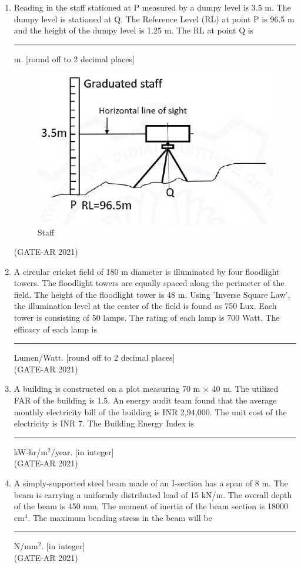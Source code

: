 \documentclass[a4paper,10pt]{article}
\begin{document}
\begin{enumerate}
    \item Reading in the staff stationed at P measured by a dumpy level is 3.5 m. The dumpy level is stationed at Q. The Reference Level (RL) at point P is 96.5 m and the height of the dumpy level is 1.25 m. The RL at point Q is \rule{2cm}{0.4pt} m. [round off to 2 decimal places] \\
    \begin{figure}[h!]
    \centering
    \includegraphics[width=0.5\columnwidth]{figs/11.jpg}
    \caption{Staff}
    \label{fig:Img11}
    \end{figure}
    \hfill (GATE-AR 2021)

    \item A circular cricket field of 180 m diameter is illuminated by four floodlight towers. The floodlight towers are equally spaced along the perimeter of the field. The height of the floodlight tower is 48 m. Using 'Inverse Square Law', the illumination level at the center of the field is found as 750 Lux. Each tower is consisting of 50 lamps. The rating of each lamp is 700 Watt. The efficacy of each lamp is \rule{2cm}{0.4pt} Lumen/Watt. [round off to 2 decimal places] \\
    \hfill (GATE-AR 2021)

    \item A building is constructed on a plot measuring 70 m $\times$ 40 m. The utilized FAR of the building is 1.5. An energy audit team found that the average monthly electricity bill of the building is INR 2,94,000. The unit cost of the electricity is INR 7. The Building Energy Index is \rule{2cm}{0.4pt} kW-hr/m$^2$/year. [in integer] \\
    \hfill (GATE-AR 2021)

    \item A simply-supported steel beam made of an I-section has a span of 8 m. The beam is carrying a uniformly distributed load of 15 kN/m. The overall depth of the beam is 450 mm. The moment of inertia of the beam section is 18000 cm$^4$. The maximum bending stress in the beam will be \rule{2cm}{0.4pt} N/mm$^2$. [in integer] \\
    \hfill (GATE-AR 2021)


\end{enumerate}
\end{document}
